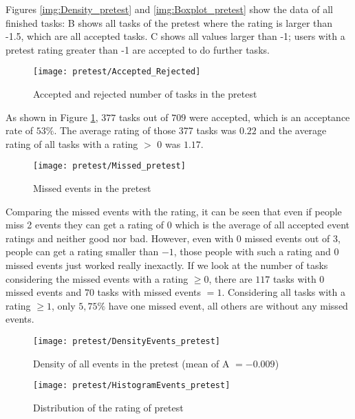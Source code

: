 Figures \ref{img:Density_pretest} and \ref{img:Boxplot_pretest} show the data of all finished tasks: B shows all tasks of the pretest where the rating is larger than -1.5, which are all accepted tasks. C shows all values larger than -1; users with a pretest rating greater than -1 are accepted to do further tasks.

\begin{figure}[H]
    \centering
    \texttt{[image: pretest/Accepted\_Rejected]}
    \caption{Accepted and rejected number of tasks in the pretest}
    \label{img:accepted:rejected:Pretest}
\end{figure}

As shown in Figure \ref{img:accepted:rejected:Pretest}, $377$ tasks out of $709$ were accepted, which is an acceptance rate of $53\%$. The average rating of those 377 tasks was $0.22$ and the average rating of all tasks with a rating $>$ 0 was $1.17$.

\begin{figure}[H]
    \centering
    \texttt{[image: pretest/Missed\_pretest]}
    \caption{Missed events in the pretest}
    \label{img:missedPretest}
\end{figure}

Comparing the missed events with the rating, it can be seen that even if people miss 2 events they can get a rating of 0 which is the average of all accepted event ratings and neither good nor bad.
However, even with 0 missed events out of 3, people can get a rating smaller than $-1$, those people with such a rating and 0 missed events just worked really inexactly.
If we look at the number of tasks considering the missed events with a rating $\ge 0$, there are $117$ tasks with 0 missed events and $70$ tasks with missed events $= 1$.
Considering all tasks with a rating $\ge 1$, only $5,75 \%$ have one missed event, all others are without any missed events.


\begin{figure}[H]
    \centering
    \texttt{[image: pretest/DensityEvents\_pretest]}
    \caption{Density of all events in the pretest (mean of A $= - 0.009$)}
\end{figure}

\begin{figure}[H]
    \centering
    \texttt{[image: pretest/HistogramEvents\_pretest]}
    \caption{Distribution of the rating of pretest}
\end{figure}

